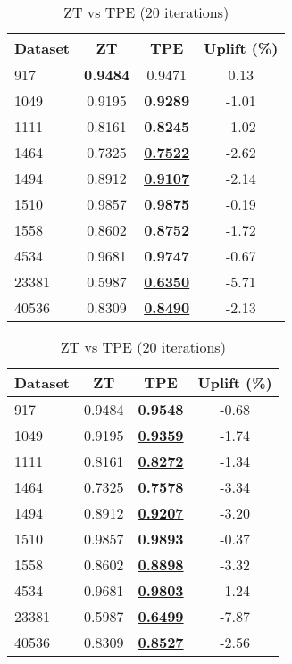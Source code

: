 \begin{table}[htbp]
\begin{center}
\begin{small}
\begin{sc}
\begin{subtable}[t]{0.48\textwidth}
    \centering
    \caption{ZT vs TPE (10 iterations)}
    \label{tab:randomforest-zt-vs-tpe-10}
    \begin{tabular}{lccc}
    \toprule
    \textbf{Dataset} & \textbf{ZT} & \textbf{TPE} & \textbf{Uplift (\%)} \\
    \midrule
    917    & \textbf{0.9484} & 0.9471 & 0.13 \\
    1049    & 0.9195 & \textbf{0.9289} & -1.01 \\
    1111    & 0.8161 & \textbf{0.8245} & -1.02 \\
    1464    & 0.7325 & \underline{\textbf{0.7522}} & -2.62 \\
    1494    & 0.8912 & \underline{\textbf{0.9107}} & -2.14 \\
    1510    & 0.9857 & \textbf{0.9875} & -0.19 \\
    1558    & 0.8602 & \underline{\textbf{0.8752}} & -1.72 \\
    4534    & 0.9681 & \textbf{0.9747} & -0.67 \\
    23381    & 0.5987 & \underline{\textbf{0.6350}} & -5.71 \\
    40536    & 0.8309 & \underline{\textbf{0.8490}} & -2.13 \\
    \bottomrule
    \end{tabular}
\end{subtable}
\hfill
\begin{subtable}[t]{0.48\textwidth}
    \centering
    \caption{ZT vs TPE (20 iterations)}
    \label{tab:randomforest-zt-vs-tpe-20}
    \begin{tabular}{lccc}
    \toprule
    \textbf{Dataset} & \textbf{ZT} & \textbf{TPE} & \textbf{Uplift (\%)} \\
    \midrule
    917    & 0.9484 & \textbf{0.9548} & -0.68 \\
    1049    & 0.9195 & \underline{\textbf{0.9359}} & -1.74 \\
    1111    & 0.8161 & \underline{\textbf{0.8272}} & -1.34 \\
    1464    & 0.7325 & \underline{\textbf{0.7578}} & -3.34 \\
    1494    & 0.8912 & \underline{\textbf{0.9207}} & -3.20 \\
    1510    & 0.9857 & \textbf{0.9893} & -0.37 \\
    1558    & 0.8602 & \underline{\textbf{0.8898}} & -3.32 \\
    4534    & 0.9681 & \underline{\textbf{0.9803}} & -1.24 \\
    23381    & 0.5987 & \underline{\textbf{0.6499}} & -7.87 \\
    40536    & 0.8309 & \underline{\textbf{0.8527}} & -2.56 \\
    \bottomrule
    \end{tabular}
\end{subtable}

\end{sc}
\end{small}
\end{center}
\vskip -0.1in
\end{table}